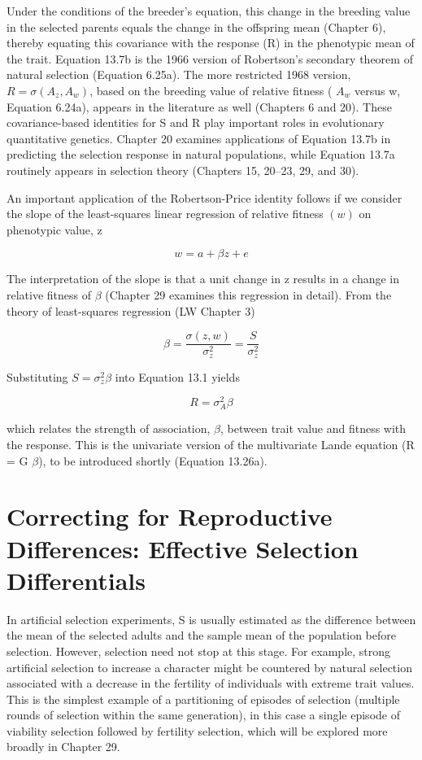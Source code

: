 \documentclass{article}
\begin{document}
Under the conditions of the breeder’s equation, this change in the breeding value in the selected parents equals the change in the offspring mean (Chapter 6), thereby equating this covariance with the response (R) in the phenotypic mean of the trait. Equation 13.7b is the 1966 version of Robertson’s secondary theorem of natural selection (Equation 6.25a). The more restricted 1968 version,  $ R = \sigma(A_z, A_w) $, based on the breeding value of relative fitness ( $ A_w $ versus w, Equation 6.24a), appears in the literature as well (Chapters 6 and 20). These covariance-based identities for S and R play important roles in evolutionary quantitative genetics. Chapter 20 examines applications of Equation 13.7b in predicting the selection response in natural populations, while Equation 13.7a routinely appears in selection theory (Chapters 15, 20–23, 29, and 30).

An important application of the Robertson-Price identity follows if we consider the slope of the least-squares linear regression of relative fitness  $ (w) $ on phenotypic value, z

\begin{equation}
w=a+\beta z+e
\tag{13.8a}
\label{eq:13_8a}
\end{equation}

The interpretation of the slope is that a unit change in z results in a change in relative fitness of  $ \beta $ (Chapter 29 examines this regression in detail). From the theory of least-squares regression (LW Chapter 3)

\begin{equation}
\beta=\frac{\sigma(z,w)}{\sigma_{z}^{2}}=\frac{S}{\sigma_{z}^{2}}
\tag{13.8b}
\label{eq:13_8b}
\end{equation}

Substituting  $ S = \sigma_z^2 \beta $ into Equation 13.1 yields

\begin{equation}
R=\sigma_{A}^{2}\beta
\tag{13.8c}
\label{eq:13_8c}
\end{equation}

which relates the strength of association,  $ \beta $, between trait value and fitness with the response. This is the univariate version of the multivariate Lande equation (R = G $ \beta $), to be introduced shortly (Equation 13.26a).

\section{Correcting for Reproductive Differences: Effective Selection Differentials}
In artificial selection experiments, S is usually estimated as the difference between the mean of the selected adults and the sample mean of the population before selection. However, selection need not stop at this stage. For example, strong artificial selection to increase a character might be countered by natural selection associated with a decrease in the fertility of individuals with extreme trait values. This is the simplest example of a partitioning of episodes of selection (multiple rounds of selection within the same generation), in this case a single episode of viability selection followed by fertility selection, which will be explored more broadly in Chapter 29.
\end{document}
